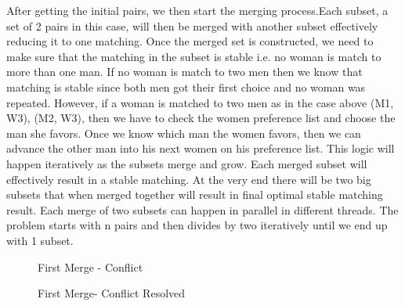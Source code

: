 After getting the initial pairs, we then start the merging process.Each subset, a set of 2 pairs in this case, will then be merged with another subset effectively reducing it to one matching. Once the merged set is constructed, we need to make sure that the matching in the subset is stable i.e. no woman is match to more than one man. If no woman is match to two men then we know that matching is stable since both men got their first choice and no woman was repeated. However, if a woman is matched to two men as in the case above {(M1, W3), (M2, W3)}, then we have to check the women preference list and choose the man she favors. Once we know which man the women favors, then we can advance the other man into his next women on his preference list. This logic will happen iteratively as the subsets merge and grow. Each merged subset will effectively result in a stable matching. At the very end there will be two big subsets that when merged together will result in final optimal stable matching result. Each merge of two subsets can happen in parallel in different threads. The problem starts with n pairs and then divides by two iteratively until we end up with 1 subset.

\begin{figure}[!ht]
    \centering
    \caption{First Merge - Conflict}
    \label{fig:DivideAndConquer_1}
\end{figure}

\begin{figure}[!ht]
    \centering
    \caption{First Merge- Conflict Resolved}
    \label{fig:DivideAndConquer_1}
\end{figure}

